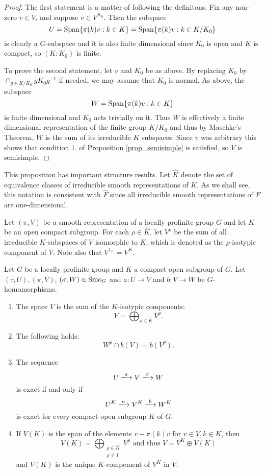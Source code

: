 \begin{proof}
    The first statement is a matter of following the definitons. Fix any non-zero $v\in V$, and suppose $v\in V^{K_0}$. Then the subspace 
    $$U=\mathrm{Span}\{\pi(k)v:k\in K\}=\mathrm{Span}\{\pi(k)v:k\in K/K_0\}$$
    is clearly a $G$-subspace and it is also finite dimensional since $K_0$ is open and $K$ is compact, so $(K:K_0)$ is finite.   

    To prove the second statement, let $v$ and $K_0$ be as above. By replacing $K_0$ by $\cap_{g\in K/K_0}gK_0g^{-1}$ if needed, we may assume that $K_0$ is normal. As above, the subspace 
    $$W=\mathrm{Span}\{\pi(k)v:k\in K\}$$
    is finite dimensional and $K_0$ acts trivially on it.
    Thus $W$ is effectively a finite dimensional representation of the finite group $K/K_0$ and thus by Maschke's Theorem, $W$ is the sum of its irreducible $K$ subspaces. Since $v$ was arbitrary this shows that condition $1.$ of Proposition \ref{prop_semisimple} is satisfied, so $V$ is semisimple.

\end{proof}

This proposition has important structure results. Let $\hat{K}$ denote the set of equivalence classes of irreducible smooth representations of $K$. As we shall see, this notation is consistent with $\hat{F}$ since all irreducible smooth representations of $F$ are one-dimensional.

Let $(\pi,V)$ be a smooth representation of a locally profinite group $G$ and let $K$ be an open compact subgroup. For each $\rho\in\hat{K}$, let $V^\rho$ be the sum of all irreducible $K$-subspaces of $V$ isomorphic to $K$, which is denoted as the $\rho$-isotypic component of $V$. Note also that $V^{1_K}=V^K$.

\begin{prop}
    Let $G$ be a locally profinite group and $K$ a compact open subgroup of $G$. Let $(\tau,U),(\pi,V)$, $(\sigma,W)\in\mathrm{Smo}_G$ and $a:U\rightarrow V$ and $b:V\rightarrow W$ be $G$-homomorphisms. 
    \begin{enumerate}
        \item The space $V$ is the sum of the $K$-isotypic components:
        $$V=\bigoplus_{\rho\in\hat{K}}V^\rho.$$
        \item The following holds:
        $$W^\rho\cap b(V)=b(V^\rho).$$
        \item The sequence
        $$U\xlongrightarrow{a} V\xlongrightarrow{b} W$$
        is exact if and only if 
        $$U^K\xlongrightarrow{a} V^K \xlongrightarrow{b} W^K$$
        is exact for every compact open subgroup $K$ of $G$.
        \item If $V(K)$ is the span of the elements $v-\pi(k)v$ for $v\in V, k\in K$, then
        $$V(K)=\bigoplus_{\substack{\rho\in\hat{K}\\\rho\neq 1}}V^\rho \text{ and thus } V=V^K\oplus V(K)$$
        and $V(K)$ is the unique $K$-compement of $V^K$ in $V$. 
    \end{enumerate}
\end{prop}

